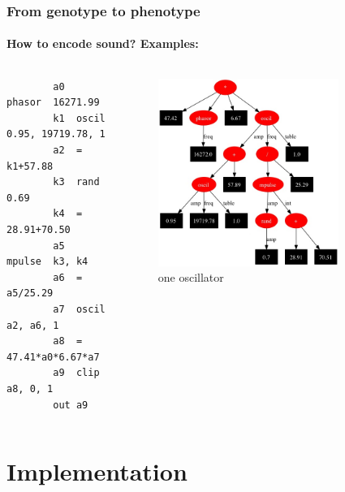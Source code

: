 \documentclass{beamer}
\begin{document}
\begin{frame}[fragile]
	\frametitle{From genotype to phenotype}
	\framesubtitle{How to encode sound? Examples:}
	
	\begin{columns}[t] 
		\begin{lstlisting}
		a0	phasor	16271.99
		k1	oscil	0.95, 19719.78, 1
		a2	=	k1+57.88
		k3	rand	0.69
		k4	=	28.91+70.50
		a5	mpulse	k3, k4
		a6	=	a5/25.29
		a7	oscil	a2, a6, 1
		a8	=	47.41*a0*6.67*a7
		a9	clip	a8, 0, 1
		out	a9
		\end{lstlisting}
		
		\begin{figure}[h]
			\centering
				\includegraphics[width=0.8\textwidth]{images/large_graph.jpg}
			\caption{one oscillator}
			\label{sg:fig:images_one_oscil}
		\end{figure}
	\end{columns}
\end{frame}





\section{Implementation} %
\end{document}
